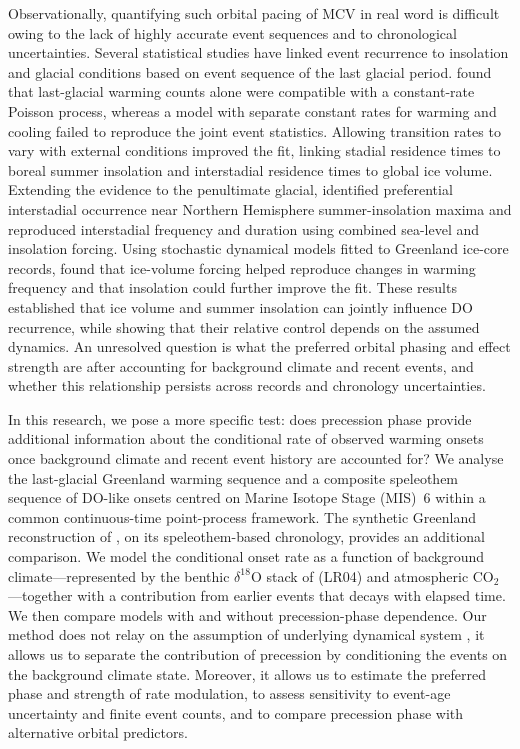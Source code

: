 \documentclass[11pt]{article}
\begin{document}
Observationally, quantifying such orbital pacing of MCV in real word is difficult owing to the lack of highly accurate event sequences and to chronological uncertainties. Several statistical studies have linked event recurrence to insolation and glacial conditions based on event sequence of the last glacial period. \citet{lohmann2018random} found that last-glacial warming counts alone were compatible with a constant-rate Poisson process, whereas a model with separate constant rates for warming and cooling failed to reproduce the joint event statistics. Allowing transition rates to vary with external conditions improved the fit, linking stadial residence times to boreal summer insolation and interstadial residence times to global ice volume. Extending the evidence to the penultimate glacial, \citet{fohlmeister2023role} identified preferential interstadial occurrence near Northern Hemisphere summer-insolation maxima and reproduced interstadial frequency and duration using combined sea-level and insolation forcing. Using stochastic dynamical models fitted to Greenland ice-core records, \citet{mitsui2017influence} found that ice-volume forcing helped reproduce changes in warming frequency and that insolation could further improve the fit. These results established that ice volume and summer insolation can jointly influence DO recurrence, while showing that their relative control depends on the assumed dynamics. An unresolved question is what the preferred orbital phasing and effect strength are after accounting for background climate and recent events, and whether this relationship persists across records and chronology uncertainties.

In this research, we pose a more specific test: does precession phase provide additional information about the conditional rate of observed warming onsets once background climate and recent event history are accounted for? We analyse the last-glacial Greenland warming sequence \citep{rasmussen2014stratigraphic} and a composite speleothem sequence of DO-like onsets centred on Marine Isotope Stage (MIS)~6 \citep{fohlmeister2023mfData,held2024sofularData} within a common continuous-time point-process framework. The synthetic Greenland reconstruction of \citet{barker2011800}, on its speleothem-based chronology, provides an additional comparison. We model the conditional onset rate as a function of background climate---represented by the benthic $\delta^{18}\mathrm{O}$ stack of \citet{lisiecki2005pliocene} (LR04) and atmospheric CO$_2$---together with a contribution from earlier events that decays with elapsed time. We then compare models with and without precession-phase dependence. Our method does not relay on the assumption of underlying dynamical system \cite{mitsui2017influence}, it allows us to separate the contribution of precession by conditioning the events on the background climate state. Moreover, it allows us to estimate the preferred phase and strength of rate modulation, to assess sensitivity to event-age uncertainty and finite event counts, and to compare precession phase with alternative orbital predictors. 
\end{document}
